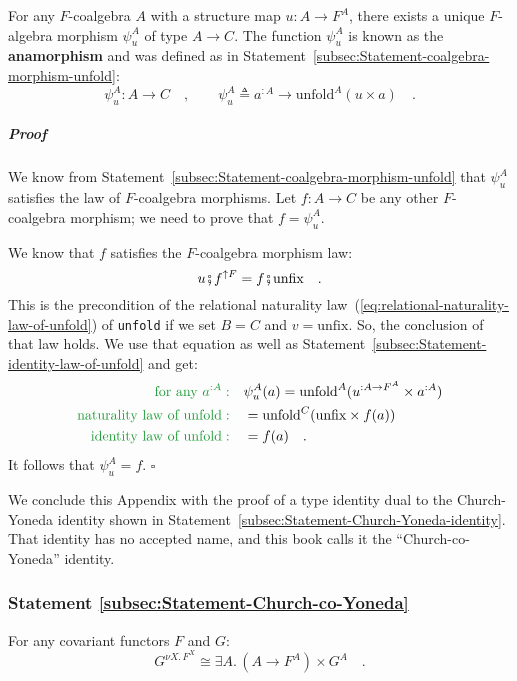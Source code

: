 For any $F$-coalgebra $A$ with a structure map $u:A\rightarrow F^{A}$,
there exists a unique $F$-algebra morphism $\psi_{u}^{A}$ of type
$A\rightarrow C$. The function $\psi_{u}^{A}$ is known as the \textbf{anamorphism}
and was defined as in Statement~\ref{subsec:Statement-coalgebra-morphism-unfold}:
\[
\psi_{u}^{A}:A\rightarrow C\quad,\quad\quad\psi_{u}^{A}\triangleq a^{:A}\rightarrow\text{unfold}^{A}(u\times a)\quad.
\]


\subparagraph{Proof}

We know from Statement~\ref{subsec:Statement-coalgebra-morphism-unfold}
that $\psi_{u}^{A}$ satisfies the law of $F$-coalgebra morphisms.
Let $f:A\rightarrow C$ be any other $F$-coalgebra morphism; we need
to prove that $f=\psi_{u}^{A}$.

We know that $f$ satisfies the $F$-coalgebra morphism law:
\[
u\bef f^{\uparrow F}=f\bef\text{unfix}\quad.
\]
This is the precondition of the relational naturality law~(\ref{eq:relational-naturality-law-of-unfold})
of \lstinline!unfold! if we set $B=C$ and $v=\text{unfix}$. So,
the conclusion of that law holds. We use that equation as well as
Statement~\ref{subsec:Statement-identity-law-of-unfold} and get:
\begin{align*}
{\color{greenunder}\text{for any }a^{:A}:}\quad & \psi_{u}^{A}(a)=\text{unfold}^{A}(u^{:A\rightarrow F^{A}}\times a^{:A})\\
{\color{greenunder}\text{naturality law of }\text{unfold}:}\quad & =\text{unfold}^{C}(\text{unfix}\times f(a))\\
{\color{greenunder}\text{identity law of }\text{unfold}:}\quad & =f(a)\quad.
\end{align*}
It follows that $\psi_{u}^{A}=f$. $\square$

We conclude this Appendix with the proof of a type identity dual to
the Church-Yoneda identity shown
in Statement~\ref{subsec:Statement-Church-Yoneda-identity}. That
identity has no accepted name, and this book calls it the \textsf{``}Church-co-Yoneda\textsf{''}
identity.

\subsubsection{Statement \label{subsec:Statement-Church-co-Yoneda}\ref{subsec:Statement-Church-co-Yoneda}}

For any covariant functors $F$ and $G$:
\[
G^{\nu X.\,F^{X}}\cong\exists A.\,(A\rightarrow F^{A})\times G^{A}\quad.
\]


